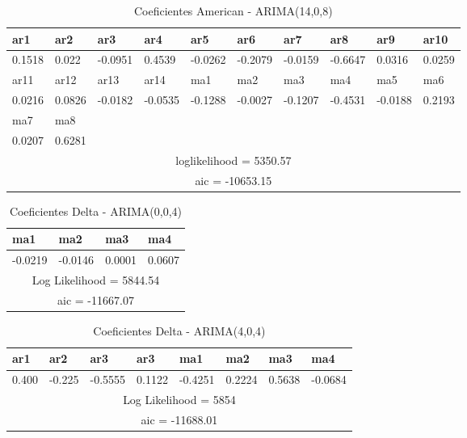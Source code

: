 \documentclass[12pt]{article}
\begin{document}
\begin{table}[H]
	\centering
	\begin{tabular}{|l|l|l|l|l|l|l|l|l|l|}
		\hline
		ar1    & ar2    & ar3     & ar4     & ar5     & ar6     & ar7     & ar8     & ar9     & ar10   \\ \hline
		0.1518 & 0.022  & -0.0951 & 0.4539  & -0.0262 & -0.2079 & -0.0159 & -0.6647 & 0.0316  & 0.0259 \\ \hline
		ar11   & ar12   & ar13    & ar14    & ma1     & ma2     & ma3     & ma4     & ma5     & ma6    \\ \hline
		0.0216 & 0.0826 & -0.0182 & -0.0535 & -0.1288 & -0.0027 & -0.1207 & -0.4531 & -0.0188 & 0.2193 \\ \hline
		ma7    & ma8    & \multicolumn{8}{l|}{}                                                        \\ \hline
		0.0207 & 0.6281 & \multicolumn{8}{l|}{}                                                        \\ \hline
		\multicolumn{10}{|c|}{loglikelihood = 5350.57}                                                 \\ \hline
		\multicolumn{10}{|c|}{aic = -10653.15}                                                         \\ \hline
	\end{tabular}
\caption{Coeficientes American - ARIMA(14,0,8)}
\label{tab:American1408}
\end{table}

\begin{table}[H]
	\centering
	\begin{tabular}{|l|l|l|l|}
		\hline
		ma1        & ma2        & ma3       & ma4      \\ \hline
		-0.0219    & -0.0146    & 0.0001    & 0.0607   \\ \hline
		\multicolumn{4}{|c|}{Log Likelihood = 5844.54} \\ \hline
		\multicolumn{4}{|c|}{aic = -11667.07}          \\ \hline
	\end{tabular}
\caption{Coeficientes Delta - ARIMA(0,0,4)}
\label{tab:Delta004}
\end{table}

\begin{table}[H]
	\centering
	\begin{tabular}{|l|l|l|l|l|l|l|l|}
		\hline
		ar1   & ar2    & ar3     & ar3    & ma1     & ma2    & ma3    & ma4     \\ \hline
		0.400 & -0.225 & -0.5555 & 0.1122 & -0.4251 & 0.2224 & 0.5638 & -0.0684 \\ \hline
		\multicolumn{8}{|c|}{Log Likelihood = 5854}                             \\ \hline
		\multicolumn{8}{|c|}{aic = -11688.01}                                   \\ \hline
	\end{tabular}
\caption{Coeficientes Delta - ARIMA(4,0,4)}
\label{tab:Delta404}
\end{table}
\end{document}
